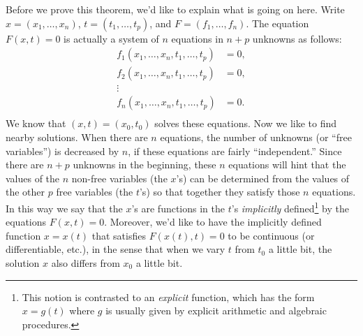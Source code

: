 \documentclass[11pt]{article}
\begin{document}
Before we prove this theorem, we'd like to explain what is going on here.
Write $x = (x_1, \dots, x_n)$, $t = (t_1, \dots, t_p)$, and $F = (f_1, \dots, f_n)$.
The equation $F(x,t) = 0$ is actually a system of $n$ equations in $n+p$ unknowns as follows:
\begin{align*}
  f_1(x_1, \dots, x_n, t_1, \dots, t_p) &= 0, \\
  f_2(x_1, \dots, x_n, t_1, \dots, t_p) &= 0, \\
  \vdots \qquad\qquad& \\
  f_n(x_1, \dots, x_n, t_1, \dots, t_p) &= 0. \\
\end{align*}
We know that $(x,t) = (x_0, t_0)$ solves these equations.
Now we like to find nearby solutions.
When there are $n$ equations, the number of unknowns (or ``free variables'') is decreased by $n$, if these equations are fairly ``independent.''
Since there are $n+p$ unknowns in the beginning, these $n$ equations will hint that the values of the $n$ non-free variables (the $x$'s) can be determined from the values of the other $p$ free variables (the $t$'s) so that together they satisfy those $n$ equations.
In this way we say that the $x$'s are functions in the $t$'s \textit{implicitly} defined\footnote{This notion is contrasted to an \textit{explicit} function, which has the form $x = g(t)$ where $g$ is usually given by explicit arithmetic and algebraic procedures.} by the equations $F(x,t) = 0$.
Moreover, we'd like to have the implicitly defined function $x = x(t)$ that satisfies $F(x(t),t) = 0$ to be continuous (or differentiable, etc.), in the sense that when we vary $t$ from $t_0$ a little bit, the solution $x$ also differs from $x_0$ a little bit.
\end{document}
